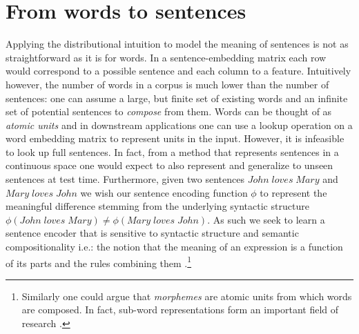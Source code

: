 \section{From words to sentences}
\label{sec:sentences}
Applying the distributional intuition to model the meaning of sentences is not as straightforward
as it is for words. In a sentence-embedding matrix each row
would correspond to a possible sentence and each column to a feature.
Intuitively however,  the number of words in a corpus is much
lower than the number of sentences: one can assume a large, but finite set
of existing words and an infinite set of
potential sentences to \emph{compose} from them.
Words can be thought of as \emph{atomic units} and
in downstream applications one can use a lookup operation on a word embedding matrix
to represent units in the input. However, it is infeasible to look up full sentences.
In fact, from a method that represents sentences in a continuous space one would expect
to also represent and generalize to unseen sentences at test time.
Furthermore, given two sentences $\mathit{John \; loves \; Mary}$ and
$\mathit{Mary \; loves \; John}$ we wish our sentence encoding function
$\phi$ to represent the meaningful difference stemming from the underlying syntactic structure
$\phi(\mathit{John \; loves \; Mary}) \neq \phi(\mathit{Mary \; loves \; John})$.
As such we seek to learn a sentence encoder that is sensitive to
syntactic structure and semantic compositionality i.e.:
the notion that the meaning of an expression is
a function of its parts and the rules combining them \citep{montague1970english}.\footnote{Similarly one could argue that \emph{morphemes} are atomic units from which words are composed. In fact, sub-word
representations form an important field of research \citep{bojanowski2017enriching}.}

